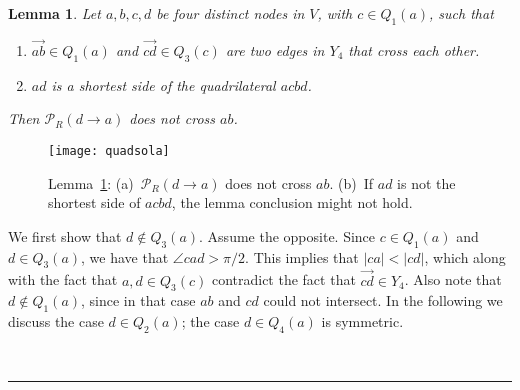 \pdfoutput=1  \documentclass[11pt]{article}
\newtheorem{lemma}{Lemma}
\newcommand{\qed}{\rule{0.5em}{1.5ex}}
\newcommand{\fqed}{{\hfill~\qed}}
\newenvironment{proof}{{\noindent \bf Proof.}}
                      {{\hfill \fqed} \vspace{1em}}
\newcommand{\Pa}{{\mathcal P}}
\begin{document}
\begin{lemma}
Let $a, b, c, d$ be four distinct nodes in $V$, with $c \in Q_1(a)$, such that
\begin{enumerate}
\item [(a)] $\overrightarrow{ab} \in Q_1(a)$ and $\overrightarrow{cd} \in Q_3(c)$ are two edges
in $Y_4$ that cross each other.
\item [(b)] $ad$ is a shortest side of the quadrilateral $acbd$.
\end{enumerate}
Then $\Pa_R(d \rightarrow a)$ does not cross $ab$.
\label{lem:c1}
\end{lemma}
\begin{proof}
\begin{figure}[htbp]
\centering
\texttt{[image: quadsola]}
\caption{Lemma~\ref{lem:c1}: (a)~$\Pa_R(d \rightarrow a)$ does not cross $ab$.
(b)~If $ad$ is not the shortest side of $acbd$, the lemma conclusion might not hold.}
\label{fig:c1}
\end{figure}
We first show that $d \notin Q_3(a)$. Assume the opposite. Since $c \in Q_1(a)$
and $d \in Q_3(a)$, we have that $\angle{cad} > \pi/2$. This implies that
$|ca| < |cd|$, which along with the fact that $a, d \in Q_3(c)$ contradict
the fact that $\overrightarrow{cd} \in Y_4$. Also note that $d \notin Q_1(a)$,
since in that case $ab$ and $cd$ could not intersect. In the following we
discuss the case $d \in Q_2(a)$; the case $d \in Q_4(a)$ is symmetric.


\end{proof}
\end{document}
